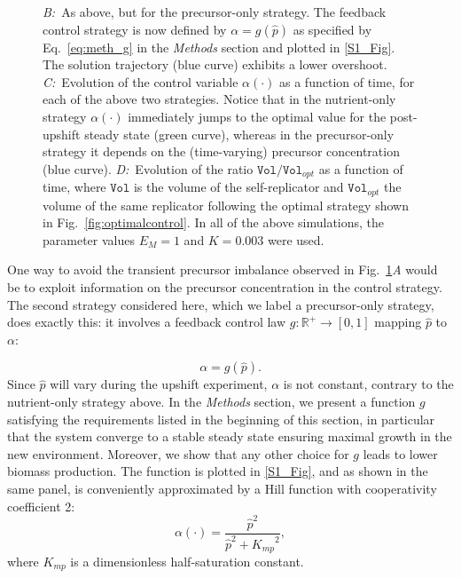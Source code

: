 \begin{figure}[p]
{\textit{B:}~As above, but for the precursor-only strategy.
The feedback control strategy is now defined by $\alpha = g(\hat{p})$ as specified by Eq.~\ref{eq:meth_g} in the \textit{Methods} section and plotted in \ref{S1_Fig}.
The solution trajectory (blue curve) exhibits a lower overshoot.
\textit{C:}~Evolution of the control variable $\alpha(\cdot)$ as a function of time, for each of the above two strategies.
Notice that in the nutrient-only strategy $\alpha(\cdot)$ immediately jumps to the optimal value for the post-upshift steady state (green curve), whereas in the precursor-only strategy it depends on the (time-varying) precursor concentration (blue curve).
\textit{D:}~Evolution of the ratio $\texttt{Vol} / \texttt{Vol}_{opt}$  as a function of time, where $\texttt{Vol}$ is the volume of the self-replicator and $\texttt{Vol}_{opt}$ the volume of the same replicator following the optimal strategy shown in Fig.~\ref{fig:optimalcontrol}.
In all of the above simulations, the parameter values $E_M=1$ and $K=0.003$ were used.
}
\label{fig:comparison_nutrients_precursor}
\end{figure}

One way to avoid the transient precursor imbalance observed in Fig.~\ref{fig:comparison_nutrients_precursor}\textit{A} would be to exploit information on the precursor concentration in the control strategy.
The second strategy considered here, which we label a precursor-only strategy, does exactly this: it involves a feedback control law $g \colon \mathbb{R}^+ \to [0,1]$ mapping $\hat{p}$ to $\alpha$:

\begin{equation}
\alpha = g(\hat{p}).
\label{eq:precursorstrategy}
\end{equation}
Since $\hat{p}$ will vary during the upshift experiment, $\alpha$ is not constant, contrary to the nutrient-only strategy above.
In the \textit{Methods} section, we present a function $g$ satisfying the requirements listed in the beginning of this section, in particular that the system converge to a stable steady state ensuring maximal growth in the new environment.
Moreover, we show that any other choice for $g$ leads to lower biomass production.
The function is plotted in \ref{S1_Fig}, and as shown in the same panel, is conveniently approximated by a Hill function with cooperativity coefficient 2:
\begin{equation}\label{eq:HillApprox}
\alpha (\cdot)= \dfrac{\hat{p}^2}{\hat{p}^2 + {K_{mp}}^2},
\end{equation}
where $K_{mp}$ is a dimensionless half-saturation constant.

